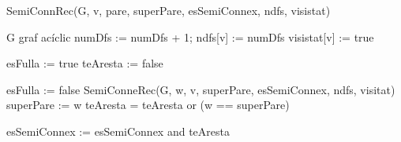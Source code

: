 \documentclass[a4paper,12pt]{article}
\begin{document}
\begin{algorithm}[H]
    \caption{SemiConnRec(G, v, pare, superPare, esSemiConnex, ndfs, visistat)}
    \begin{algorithmic}[1]  %
        \Require G graf acíclic
        \State numDfs := numDfs + 1; ndfs[v] := numDfs
        \State visistat[v] := true

        \State esFulla := true
        \State teAresta := false

        \State
        
                \State esFulla := false
                \State SemiConneRec(G, w, v, superPare, esSemiConnex, ndfs, visitat)
                \State superPare := w
            \Else
                \State teAresta = teAresta or (w == superPare)
            \EndIf
        \EndFor


            \State  esSemiConnex := esSemiConnex and teAresta
        \EndIf

    \end{algorithmic}
\end{algorithm}


\newpage
\end{document}
